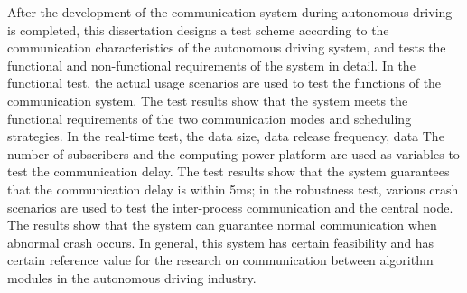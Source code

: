 \begin{abstract*}
  After the development of the communication system during autonomous driving is completed, 
  this dissertation designs a test scheme according to the communication characteristics of the autonomous driving system, 
  and tests the functional and non-functional requirements of the system in detail. 
  In the functional test, the actual usage scenarios are used to test the functions of the communication system. 
  The test results show that the system meets the functional requirements of the two communication modes and scheduling strategies. 
  In the real-time test, the data size, data release frequency, data The number of subscribers and the computing power platform are used as variables to test the communication delay. 
  The test results show that the system guarantees that the communication delay is within 5ms; in the robustness test, various crash scenarios are used to test the inter-process communication and the central node. 
  The results show that the system can guarantee normal communication when abnormal crash occurs. In general, this system has certain feasibility and has certain reference value for the research on communication between algorithm modules in the autonomous driving industry.
\end{abstract*}
